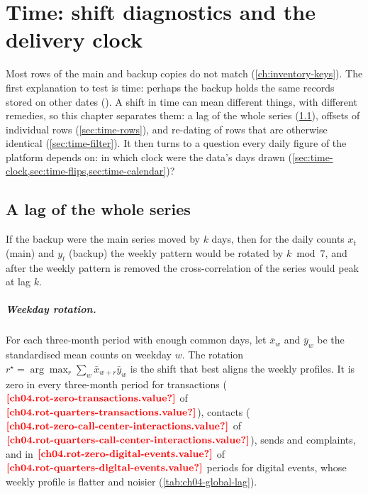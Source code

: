 \chapter{Time: shift diagnostics and the delivery clock}\label{ch:time-and-clocks}

Most rows of the main and backup copies do not match (\cref{ch:inventory-keys}). The first explanation to test is
time: perhaps the backup holds the same records stored on other dates (). A shift in time can mean
different things, with different remedies, so this chapter separates them: a lag of the whole series
(\cref{sec:time-global}), offsets of individual rows (\cref{sec:time-rows}), and re-dating of rows that are otherwise
identical (\cref{sec:time-filter}). It then turns to a question every daily figure of the platform depends on: in
which clock were the data's days drawn (\cref{sec:time-clock,sec:time-flips,sec:time-calendar})?

\section{A lag of the whole series}\label{sec:time-global}

If the backup were the main series moved by $k$ days, then for the daily counts $x_t$ (main) and
$y_t$ (backup) the weekly pattern would be rotated by $k \bmod 7$, and after the weekly pattern is removed the
cross-correlation of the series would peak at lag $k$.

\paragraph{Weekday rotation.} For each three-month period with enough common days, let $\bar x_w$ and $\bar y_w$ be the
standardised mean counts on weekday $w$. The rotation $r^\star = \arg\max_r \sum_w \bar x_{w+r} \bar y_w$ is the
shift that best aligns the weekly profiles. It is zero in every three-month period for transactions
($\est{ch04.rot-zero-transactions}{value}$ of $\est{ch04.rot-quarters-transactions}{value}$), contacts
($\est{ch04.rot-zero-call-center-interactions}{value}$ of $\est{ch04.rot-quarters-call-center-interactions}{value}$),
sends and complaints, and in $\est{ch04.rot-zero-digital-events}{value}$ of
$\est{ch04.rot-quarters-digital-events}{value}$ periods for digital events, whose weekly profile is flatter and
noisier (\cref{tab:ch04-global-lag}).

